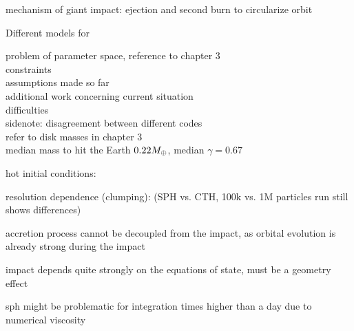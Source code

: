 mechanism of giant impact: ejection and second burn to circularize orbit

Different models for 

problem of parameter space, reference to chapter 3\\
constraints\\
assumptions made so far\\

additional work concerning
current situation\\

difficulties\\

sidenote: disagreement between different codes\\


refer to disk masses in chapter 3\\


\cite{Chambers:2001p2105}
median mass to hit the Earth $0.22 M_{\oplus}$, median $\gamma = 0.67$



hot initial conditions:
\citep{2000orem.book..179P}

resolution dependence (clumping):
\citep{Canup:2010p3713} (SPH vs. CTH, 100k vs. 1M particles run still shows differences)

accretion process cannot be decoupled from the impact, as orbital evolution is already strong during the impact 

impact depends quite strongly on the equations of state, must be a geometry effect

sph might be problematic for integration times higher than a day due to numerical viscosity \citep{Canup:2004p115} 






